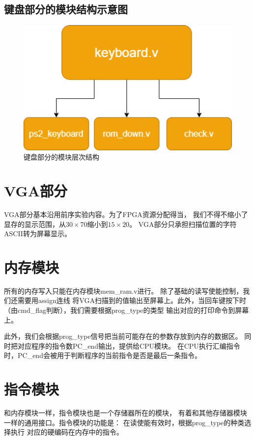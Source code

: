 \documentclass[12pt,a4paper,UTF8]{article}
\begin{document}
\subsection{键盘部分的模块结构示意图}
\begin{figure}[H]
  \centering
  \includegraphics[width=1\textwidth]{kbd_struct.png}
  \caption{键盘部分的模块层次结构}
  \label{kbd_struct}
\end{figure}


\section{VGA部分}
VGA部分基本沿用前序实验内容。为了FPGA资源分配得当，
我们不得不缩小了显存的显示范围，从$30\times70$缩小到$15\times20$。
VGA部分只承担扫描位置的字符ASCII转为屏幕显示。

\section{内存模块}
所有的内存写入只能在内存模块\mbox{mem\_ram.v}进行。
除了基础的读写使能控制，我们还需要用assign连线
将VGA扫描到的值输出至屏幕上。此外，当回车键按下时
（由cmd\_flag判断），我们需要根据prog\_type的类型
输出对应的打印命令到屏幕上。

此外，我们会根据prog\_type信号把当前可能存在的参数存放到内存的数据区。
同时把对应程序的指令数PC\_end输出，提供给CPU模块。
在CPU执行汇编指令时，PC\_end会被用于判断程序的当前指令是否是最后一条指令。


\section{指令模块}
和内存模块一样，指令模块也是一个存储器所在的模块，
有着和其他存储器模块一样的通用接口。指令模块的功能是：
在读使能有效时，根据prog\_type的种类选择执行
对应的硬编码在内存中的指令。
\end{document}
